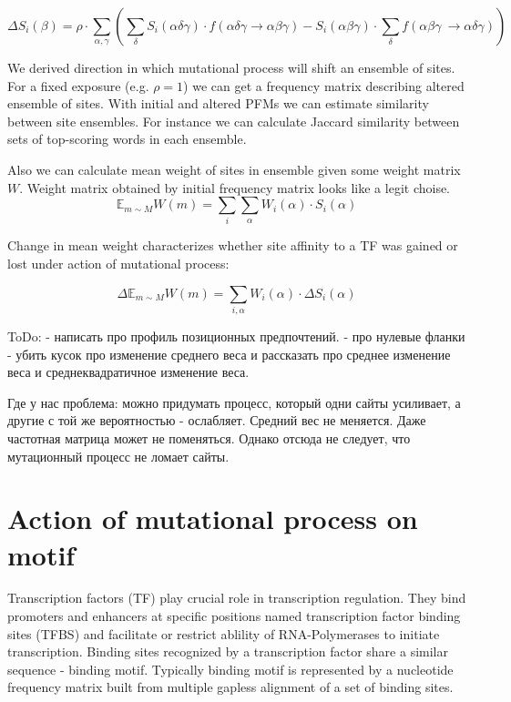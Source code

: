 \documentclass[a4paper]{article}
\begin{document}
\begin{equation}
\boxed{
\Delta S_i(\beta) = \rho\cdot\sum_{\alpha,\gamma}\left(\sum_{\delta}S_i(\alpha\delta\gamma)\cdot f(\alpha\delta\gamma \to \alpha\beta\gamma) - S_i(\alpha\beta\gamma)\cdot\sum_{\delta}f(\alpha\beta\gamma\ \to \alpha\delta\gamma)\right)
}
\end{equation}


We derived direction in which  mutational process will shift an ensemble of sites. For a fixed exposure (e.g. $\rho=1$) we can get a frequency matrix describing altered ensemble of sites. With initial and altered PFMs we can estimate similarity between site ensembles. For instance we can calculate Jaccard similarity between sets of top-scoring words in each ensemble. 

Also we can calculate mean weight of sites in ensemble given some weight matrix $W$. Weight matrix obtained by initial frequency matrix looks like a legit choise.
\begin{equation}
\mathbb{E}_{m\sim M} W(m) = \sum_i \sum_{\alpha} W_i(\alpha)\cdot S_i(\alpha)
\end{equation}

Change in mean weight characterizes whether site affinity to a TF was gained or lost under action of mutational process:

\begin{equation}
\Delta\mathbb{E}_{m\sim M} W(m) = \sum_{i,\alpha} W_i(\alpha)\cdot\Delta{S}_i(\alpha)
\end{equation}





ToDo:
- написать про профиль позиционных предпочтений. 
- про нулевые фланки
- убить кусок про изменение среднего веса и рассказать про среднее изменение веса и среднеквадратичное изменение веса.

Где у нас проблема: можно придумать процесс, который одни сайты усиливает, а другие с той же вероятностью - ослабляет. Средний вес не меняется. Даже частотная матрица может не поменяться. Однако отсюда не следует, что мутационный процесс не ломает сайты.

\section*{Action of mutational process on motif}
Transcription factors (TF) play crucial role in transcription regulation. They bind promoters and enhancers at specific positions named transcription factor binding sites (TFBS) and facilitate or restrict ablility of RNA-Polymerases to initiate transcription. Binding sites recognized by a transcription factor share a similar sequence - binding motif. Typically binding motif is represented by a nucleotide frequency matrix built from multiple gapless alignment of a set of binding sites.
\end{document}
